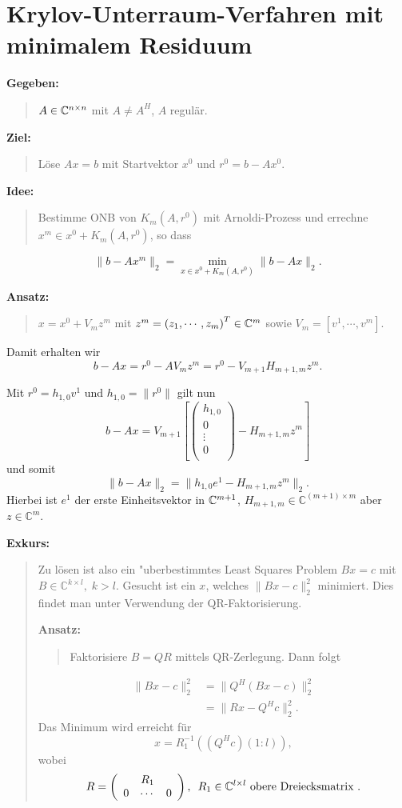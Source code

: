 \section[KUV mit minimalem Residuum]{Krylov-Unterraum-Verfahren mit minimalem Residuum}

{\bf Gegeben: }
\begin{quote}
$A \in \mathbb{C}^{n\times n}$ mit $A \neq A^H$,  $A$ regul\"ar.
\end{quote}
{\bf Ziel: }
\begin{quote}
L\"ose $Ax = b$ mit Startvektor $x^0$ und $r^0 = b-Ax^0$.
\end{quote}
{\bf Idee:}
\begin{quote}
Bestimme ONB von $K_m(A,r^0)$ mit Arnoldi-Prozess und errechne $x^m \in x^0 + K_m(A,r^0)$, so dass
\end{quote}
\[
\|b-Ax^m\|_2 = \underset{x \in x^0 + K_m(A,r^0)}{\min} \|b-Ax\|_2.
\]

{\bf Ansatz:}
\begin{quote}
$x = x^0 + V_m z^m$ mit $z^m = \left(z_1,\cdots,z_m\right)^T \in \mathbb{C}^m$ sowie
$V_m = \left[ v^1,\cdots,v^m \right]$.
\end{quote}

Damit erhalten wir
\[
b - Ax = r^0 - AV_m z^m = r^0 - V_{m+1}H_{m+1,m}z^m.
\]

Mit $r^0 = h_{1,0} v^1$ und $h_{1,0} = \|r^0\|$ gilt nun
\[
b-Ax = V_{m+1} \left[
\left(%
\begin{array}{c}
  h_{1,0} \\
  0 \\
  \vdots \\
  0 \\
\end{array}%
\right) - H_{m+1,m} z^m \right]
\]
und somit
\[
\|b-Ax\|_2 = \|h_{1,0}e^1 - H_{m+1,m}z^m\|_2.
\]
Hierbei ist $e^1$ der erste Einheitsvektor in $\mathbb{C}^{m+1}$,
$H_{m+1,m} \in \mathbb{C}^{(m+1)\times m}$
aber $z \in \mathbb{C}^m$.

\clearpage

{\bf Exkurs:}

\begin{quote}
Zu l\"osen ist also ein "uberbestimmtes Least Squares Problem $Bx = c$ mit
$B\in \mathbb{C}^{k \times l}, \; k > l$. Gesucht ist
ein $x$, welches $\| Bx-c \|_2^2$ minimiert. Dies findet man unter Verwendung der
QR-Faktorisierung.

{\bf Ansatz:}
\begin{quote}
Faktorisiere $ B = QR$ mittels QR-Zerlegung. Dann folgt
\end{quote}
\begin{align*}
\|Bx-c\|_2^2 &= \|Q^H(Bx-c)\|_2^2\\
&= \|Rx - Q^Hc\|_2^2.
\end{align*}
Das Minimum wird erreicht f\"ur
\[
x = R_1^{-1}( (Q^Hc)(1:l) ),
\]
wobei
\[
R = \left(\begin{array}{ccc} & R_1 & \\
    0 & \cdots & 0 \end{array}
    \right), \enspace R_1 \in \mathbb{C}^{l\times l} \mbox{ obere Dreiecksmatrix }.
\]
\end{quote}

